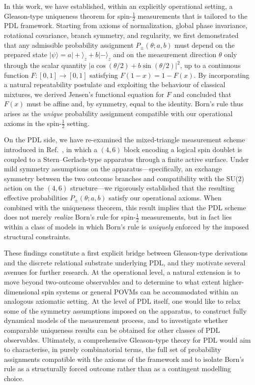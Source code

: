 \documentclass[11pt,a4paper]{article}
\numberwithin{equation}{section}
\theoremstyle{definition}
\begin{document}
In this work, we have established, within an explicitly operational setting, a Gleason-type uniqueness theorem for spin-$\tfrac12$ measurements that is tailored to the PDL framework. Starting from axioms of normalization, global phase invariance, rotational covariance, branch symmetry, and regularity, we first demonstrated that any admissible probability assignment $P_\pm(\theta;a,b)$ must depend on the prepared state $|\psi\rangle = a|+\rangle_z + b|-\rangle_z$ and on the measurement direction $\theta$ only through the scalar quantity $\bigl|a\cos(\theta/2)+b\sin(\theta/2)\bigr|^2$, up to a continuous function $F:[0,1]\to[0,1]$ satisfying $F(1-x)=1-F(x)$. By incorporating a natural repeatability postulate and exploiting the behaviour of classical mixtures, we derived Jensen’s functional equation for $F$ and concluded that $F(x)$ must be affine and, by symmetry, equal to the identity. Born’s rule thus arises as the \emph{unique} probability assignment compatible with our operational axioms in the spin-$\tfrac12$ setting.

On the PDL side, we have re-examined the mixed-triangle measurement scheme introduced in Ref.~\cite{LaubscherBornPDL2026}, in which a $(4,6)$ block encoding a logical spin doublet is coupled to a Stern–Gerlach-type apparatus through a finite active surface. Under mild symmetry assumptions on the apparatus—specifically, an exchange symmetry between the two outcome branches and compatibility with the SU(2) action on the $(4,6)$ structure—we rigorously established that the resulting effective probabilities $P_\pm(\theta;a,b)$ satisfy our operational axioms. When combined with the uniqueness theorem, this result implies that the PDL scheme does not merely \emph{realize} Born’s rule for spin-$\tfrac12$ measurements, but in fact lies within a class of models in which Born’s rule is \emph{uniquely} enforced by the imposed structural constraints.

These findings constitute a first explicit bridge between Gleason-type derivations and the discrete relational substrate underlying PDL, and they motivate several avenues for further research. At the operational level, a natural extension is to move beyond two-outcome observables and to determine to what extent higher-dimensional spin systems or general POVMs can be accommodated within an analogous axiomatic setting. At the level of PDL itself, one would like to relax some of the symmetry assumptions imposed on the apparatus, to construct fully dynamical models of the measurement process, and to investigate whether comparable uniqueness results can be obtained for other classes of PDL observables. Ultimately, a comprehensive Gleason-type theory for PDL would aim to characterise, in purely combinatorial terms, the full set of probability assignments compatible with the axioms of the framework and to isolate Born’s rule as a structurally forced outcome rather than as a contingent modelling choice.
\end{document}
